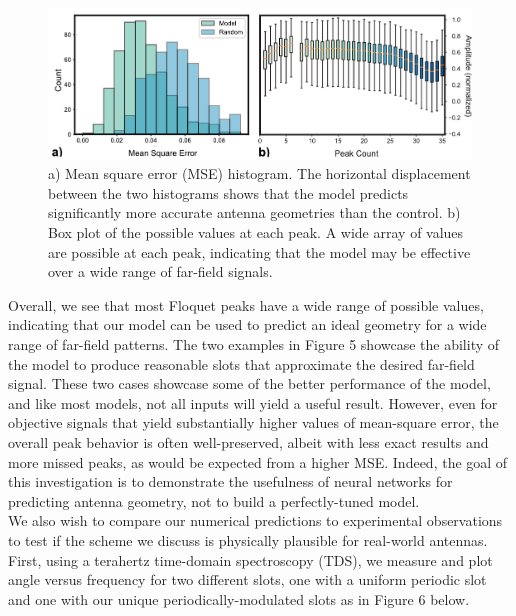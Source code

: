 \documentclass[11pt]{article}
\begin{document}
\begin{figure}[H]
	\includegraphics[width=6.5in]{figures/fig6apdf}
		\caption{a) Mean square error (MSE) histogram. The horizontal displacement between the two histograms shows that the model predicts significantly more accurate antenna geometries than the control. b) Box plot of the possible values at each peak. A wide array of values are possible at each peak, indicating that the model may be effective over a wide range of far-field signals.}
\end{figure}

\noindent Overall, we see that most Floquet peaks have a wide range of possible values, indicating that our model can be used to predict an ideal geometry for a wide range of far-field patterns. The two examples in Figure 5 showcase the ability of the model to produce reasonable slots that approximate the desired far-field signal. These two cases showcase some of the better performance of the model, and like most models, not all inputs will yield a useful result. However, even for objective signals that yield substantially higher values of mean-square error, the overall peak behavior is often well-preserved, albeit with less exact results and more missed peaks, as would be expected from a higher MSE. Indeed, the goal of this investigation is to demonstrate the usefulness of neural networks for predicting antenna geometry, not to build a perfectly-tuned model. \\

\noindent We also wish to compare our numerical predictions to experimental observations to test if the scheme we discuss is physically plausible for real-world antennas. First, using a terahertz time-domain spectroscopy (TDS), we measure and plot angle versus frequency for two different slots, one with a uniform periodic slot and one with our unique periodically-modulated slots as in Figure 6 below.
\end{document}
